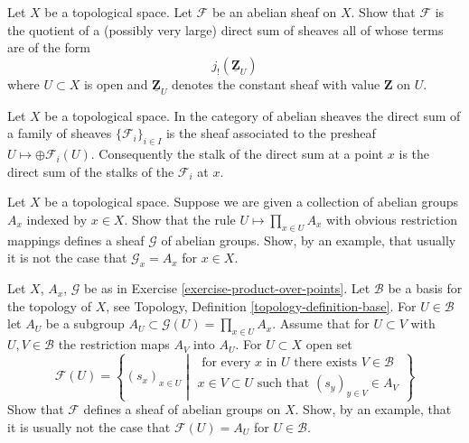 \begin{exercise}
\label{exercise-quotient-j-shriek-Z}
Let $X$ be a topological space.
Let ${\mathcal F}$ be an abelian sheaf on $X$. Show
that ${\mathcal F}$ is the quotient of a (possibly very large) direct sum
of sheaves all of whose terms are of the form
$$
j_{!}(\underline{{\mathbf Z}}_U)
$$
where $U \subset X$ is open and $\underline{{\mathbf Z}}_U$ denotes the
constant sheaf with value ${\mathbf Z}$ on $U$.
\end{exercise}

\begin{remark}
\label{remark-direct-sum-stalk-abelian}
Let $X$ be a topological space.
In the category of abelian sheaves the direct sum of
a family of sheaves $\{{\mathcal F}_i\}_{i\in I}$ is the sheaf associated to
the presheaf $U \mapsto \oplus {\mathcal F}_i(U)$. Consequently the stalk of
the direct sum at a point $x$ is the direct sum of the stalks of the
${\mathcal F}_i$ at $x$.
\end{remark}

\begin{exercise}
\label{exercise-product-over-points}
Let $X$ be a topological space. Suppose we are given a collection of
abelian groups $A_x$ indexed by $x \in X$. Show that the rule
$U \mapsto \prod_{x \in U} A_x$ with obvious restriction mappings
defines a sheaf $\mathcal{G}$ of abelian groups. Show, by an example,
that usually it is not the case that $\mathcal{G}_x = A_x$ for $x \in X$.
\end{exercise}

\begin{exercise}
\label{exercise-modified-product-over-points}
Let $X$, $A_x$, $\mathcal{G}$ be as in
Exercise \ref{exercise-product-over-points}.
Let $\mathcal{B}$ be a basis for the topology of $X$, see
Topology, Definition \ref{topology-definition-base}.
For $U \in \mathcal{B}$ let $A_U$ be a subgroup
$A_U \subset \mathcal{G}(U) = \prod_{x \in U} A_x$. Assume that for
$U \subset V$ with $U, V \in \mathcal{B}$ the restriction
maps $A_V$ into $A_U$. For $U \subset X$ open set
$$
\mathcal{F}(U) =
\left\{
(s_x)_{x \in U}
\middle|
\begin{matrix}
\text{ for every }x\text{ in }U\text{ there exists } V \in \mathcal{B} \\
x \in V \subset U\text{ such that } (s_y)_{y \in V} \in A_V
\end{matrix}
\right\}
$$
Show that $\mathcal{F}$ defines a sheaf of abelian groups on $X$.
Show, by an example, that it is usually not the case that
$\mathcal{F}(U) = A_U$ for $U \in \mathcal{B}$.
\end{exercise}





